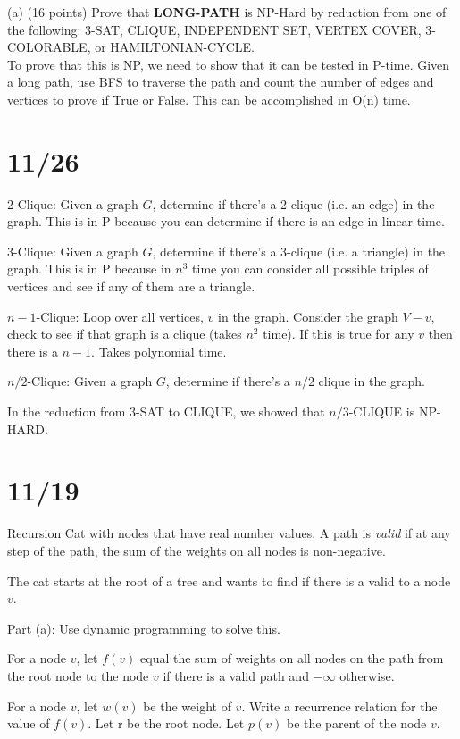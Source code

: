 \documentclass{article}
\begin{document}
(a) (16 points) Prove that \textbf{LONG-PATH} is NP-Hard by reduction from one of the following: 3-SAT, CLIQUE, INDEPENDENT SET, VERTEX COVER, 3-COLORABLE, or HAMILTONIAN-CYCLE.\\


To prove that this is NP, we need to show that it can be tested in P-time. Given a long path, use BFS to traverse the path and count the number of edges and vertices to prove if True or False. This can be accomplished in O(n) time.




\section{11/26}
2-Clique: Given a graph $G$, determine if there's a 2-clique (i.e. an edge) in the graph.
This is in P because you can determine if there is an edge in linear time.

3-Clique: Given a graph $G$, determine if there's a 3-clique (i.e. a triangle) in the graph.
This is in P because in $n^3$ time you can consider all possible triples of vertices and see if any of them are a triangle.

$n-1$-Clique: Loop over all vertices, $v$ in the graph.  Consider the graph $V-v$, check to see if that graph is a clique (takes $n^2$ time).  If this is true for any $v$ then there is a $n-1$.  Takes polynomial time.

$n/2$-Clique: Given a graph $G$, determine if there's a $n/2$ clique in the graph.

In the reduction from 3-SAT to CLIQUE, we showed that $n/3$-CLIQUE is NP-HARD.


\section{11/19}
Recursion Cat with nodes that have real number values.  
A path is \emph{valid} if at any step of the path, the sum of the weights on all nodes is non-negative.

The cat starts at the root of a tree and wants to find if there is a valid to a node $v$.

Part (a):  Use dynamic programming to solve this.

For a node $v$, let $f(v)$ equal the sum of weights on all nodes on the path from the root node to the node $v$ if there is a valid path and $-\infty$ otherwise.

For a node $v$, let $w(v)$ be the weight of $v$.
Write a recurrence relation for the value of $f(v)$.  Let r be the root node. Let $p(v)$ be the parent of the node $v$.
\end{document}
